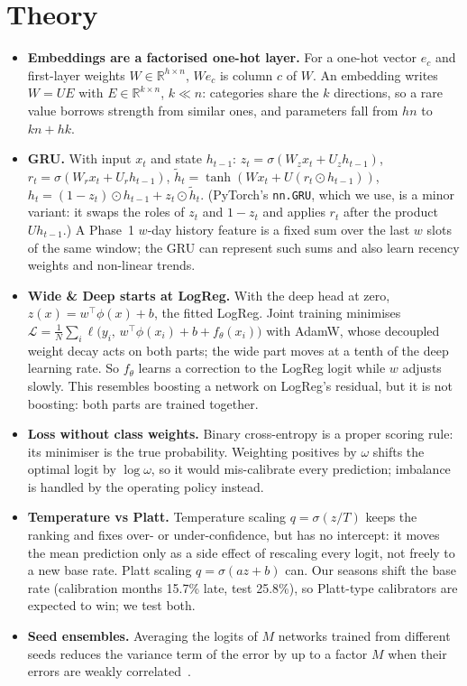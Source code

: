 \documentclass[conference]{IEEEtran}
\begin{document}
\section{Theory}\label{sec:theory}
\begin{itemize}
\item \textbf{Embeddings are a factorised one-hot layer.} For a one-hot vector $e_c$ and first-layer weights $W\in\mathbb{R}^{h\times n}$, $We_c$ is column $c$ of $W$. An embedding writes $W=UE$ with $E\in\mathbb{R}^{k\times n}$, $k\ll n$: categories share the $k$ directions, so a rare value borrows strength from similar ones, and parameters fall from $hn$ to $kn+hk$.
\item \textbf{GRU.} With input $x_t$ and state $h_{t-1}$:
$z_t=\sigma(W_zx_t+U_zh_{t-1})$, $r_t=\sigma(W_rx_t+U_rh_{t-1})$, $\tilde h_t=\tanh(Wx_t+U(r_t\odot h_{t-1}))$, $h_t=(1-z_t)\odot h_{t-1}+z_t\odot\tilde h_t$.
(PyTorch's \texttt{nn.GRU}, which we use, is a minor variant: it swaps the roles of $z_t$ and $1-z_t$ and applies $r_t$ after the product $Uh_{t-1}$.) A Phase~1 $w$-day history feature is a fixed sum over the last $w$ slots of the same window; the GRU can represent such sums and also learn recency weights and non-linear trends.
\item \textbf{Wide \& Deep starts at LogReg.} With the deep head at zero, $z(x)=w^\top\phi(x)+b$, the fitted LogReg. Joint training minimises
$\mathcal{L}=\frac1N\sum_i \ell\bigl(y_i,\,w^\top\phi(x_i)+b+f_\theta(x_i)\bigr)$
with AdamW, whose decoupled weight decay acts on both parts; the wide part moves at a tenth of the deep learning rate. So $f_\theta$ learns a correction to the LogReg logit while $w$ adjusts slowly. This resembles boosting a network on LogReg's residual, but it is not boosting: both parts are trained together.
\item \textbf{Loss without class weights.} Binary cross-entropy is a proper scoring rule: its minimiser is the true probability. Weighting positives by $\omega$ shifts the optimal logit by $\log\omega$, so it would mis-calibrate every prediction; imbalance is handled by the operating policy instead.
\item \textbf{Temperature vs Platt.} Temperature scaling $q=\sigma(z/T)$ keeps the ranking and fixes over- or under-confidence, but has no intercept: it moves the mean prediction only as a side effect of rescaling every logit, not freely to a new base rate. Platt scaling $q=\sigma(az+b)$ can. Our seasons shift the base rate (calibration months 15.7\% late, test 25.8\%), so Platt-type calibrators are expected to win; we test both.
\item \textbf{Seed ensembles.} Averaging the logits of $M$ networks trained from different seeds reduces the variance term of the error by up to a factor $M$ when their errors are weakly correlated~\cite{lakshminarayanan2017ensembles}.
\end{itemize}
\end{document}
